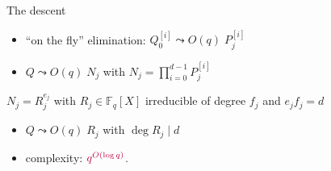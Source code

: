\documentclass[xcolor=x11names,compress]{beamer}
\theoremstyle{break}
\theoremstyle{sc}
\theoremstyle{definition}
\theoremstyle{remark}
\begin{document}
\begin{frame}{The descent}
  \begin{itemize}
    \item ``on the fly'' elimination: $Q_0^{[i]}\leadsto O(q)\;P_j^{[i]}$
    \item $Q\leadsto O(q)\;N_j$ with $N_j=\prod_{i=0}^{d-1}P_j^{[i]}$
  \end{itemize}
  
  $N_j = R_j^{e_{j}}$ with $R_j\in \mathbb{F}_q[X]$ irreducible of degree
  $f_{j}$ and $e_{j}f_{j} = d$
  \begin{itemize}
    \item $Q\leadsto O(q)\;R_j$ with $\deg R_j \;|\;d$
    \item complexity: $\textcolor{purple}{q^{O(\log q)}}$.
  \end{itemize}
\end{frame}

\end{document}
